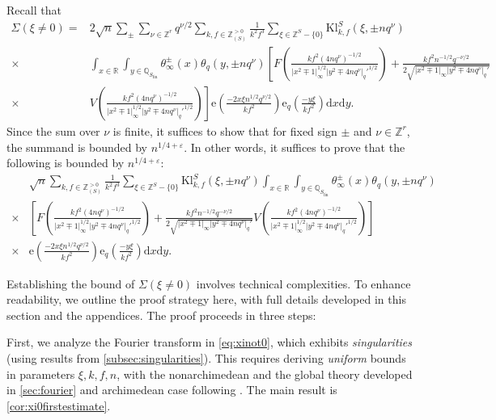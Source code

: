 \documentclass[10pt,oneside,reqno]{amsart}
\newcommand\rmd{\mathrm{d}}
\newcommand\rme{\mathrm{e}}
\newcommand\QQ{\mathbb{Q}}
\newcommand\RR{\mathbb{R}}
\newcommand\ZZ{\mathbb{Z}}
\newcommand\fin{\mathrm{fin}}
\newcommand\Kl{\mathrm{Kl}}
\newcommand\legendresymbol[2]{\genfrac{(}{)}{}{}{#1}{#2}}
\theoremstyle{THEOREM}
\theoremstyle{DEFINITION}
\theoremstyle{EXERCISE}
\numberwithin{equation}{section}
\begin{document}
Recall that
\begin{align*}
  \Sigma(\xi\neq 0)=&2\sqrt{n}\sum_{\pm}\sum_{\nu\in \ZZ^r}q^{\nu/2}\sum_{k,f\in \ZZ_{(S)}^{>0}}\frac{1}{k^2f^3}\sum_{\xi\in \ZZ^S-\{0\}}\Kl_{k,f}^S(\xi,\pm nq^\nu)\\
   \times&\int_{x\in\RR}\int_{y\in\QQ_{S_\fin}}\theta_\infty^\pm(x)\theta_{q}(y,\pm nq^\nu) \left[F\legendresymbol{kf^2(4nq^\nu)^{-1/2}}{|x^2\mp 1|_\infty^{1/2}|y^2\mp 4nq^\nu|_q'^{1/2}}+\frac{kf^2n^{-1/2}q^{-\nu/2}}{2\sqrt{|x^2\mp 1|_\infty|y^2\mp 4nq^\nu|_q'}}\right.\\
     \times&\left.V\legendresymbol{kf^2(4nq^\nu)^{-1/2}}{|x^2\mp 1|_\infty^{1/2}|y^2\mp 4nq^\nu|_q'^{1/2}}\right]\rme\legendresymbol{-2x\xi n^{1/2}q^{\nu/2}}{kf^2}\rme_{q}\legendresymbol{-y\xi}{kf^2}\rmd x\rmd y.
\end{align*}
Since the sum over $\nu$ is finite, it suffices to show that for fixed sign $\pm$ and $\nu\in \ZZ^r$, the summand is bounded by $n^{1/4+\varepsilon}$. In other words, it suffices to prove that the following is bounded by $n^{1/4+\varepsilon}$:
\begin{equation}\label{eq:xinot0}
\begin{split}
  &\sqrt{n}\sum_{k,f\in \ZZ_{(S)}^{>0}}\frac{1}{k^2f^3}\sum_{\xi\in \ZZ^S-\{0\}}\Kl_{k,f}^S(\xi,\pm nq^\nu)
   \int_{x\in\RR}\int_{y\in\QQ_{S_\fin}}\theta_\infty^\pm(x)\theta_{q}(y,\pm nq^\nu) \\ \times&\left[F\legendresymbol{kf^2(4nq^\nu)^{-1/2}}{|x^2\mp 1|_\infty^{1/2}|y^2\mp 4nq^\nu|_q'^{1/2}}+\frac{kf^2n^{-1/2}q^{-\nu/2}}{2\sqrt{|x^2\mp 1|_\infty|y^2\mp 4nq^\nu|_q'}}V\legendresymbol{kf^2(4nq^\nu)^{-1/2}}{|x^2\mp 1|_\infty^{1/2}|y^2\mp 4nq^\nu|_q'^{1/2}}\right]\\
   \times&\rme\legendresymbol{-2x\xi n^{1/2}q^{\nu/2}}{kf^2}\rme_{q}\legendresymbol{-y\xi}{kf^2}\rmd x\rmd y.
\end{split}
\end{equation}

Establishing the bound of $\Sigma(\xi\neq 0)$ involves technical complexities. To enhance readability, we outline the proof strategy here, with full details developed in this section and the appendices.
The proof proceeds in three steps:

First, we analyze the Fourier transform in \eqref{eq:xinot0}, which exhibits \emph{singularities} (using results from \autoref{subsec:singularities}). This requires deriving \emph{uniform} bounds in parameters $\xi,k,f,n$, with the nonarchimedean and the global theory developed in \autoref{sec:fourier} and archimedean case following \cite[Appendix A]{altug2017}. The main result is \autoref{cor:xi0firstestimate}.
 
\end{document}
